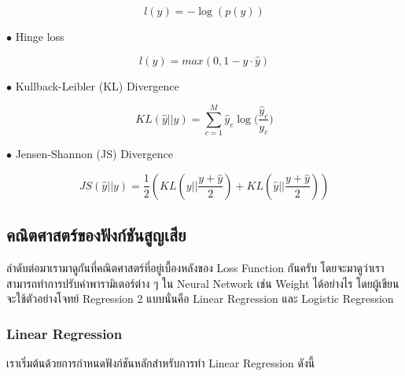 \begin{equation}
    l(y) = -{\log(p(y))}
\end{equation}

\noindent $\bullet$ Hinge loss

\begin{equation}
    l(y) = max(0, 1 - y \cdot \hat{y})
\end{equation}

\noindent $\bullet$ Kullback-Leibler (KL) Divergence

\begin{equation}
    KL(\hat{y} || y) = \sum_{c=1}^{M}\hat{y}_c \log \bigg( {\frac{\hat{y}_c}{y_c}} \bigg)
\end{equation}

\noindent $\bullet$ Jensen-Shannon (JS) Divergence

\begin{equation}
    JS(\hat{y} || y) = \frac{1}{2}(KL(y||\frac{y+\hat{y}}{2}) + KL(\hat{y}||\frac{y+\hat{y}}{2}))
\end{equation}

\subsection{คณิตศาสตร์ของฟังก์ชันสูญเสีย}

ลำดับต่อมาเรามาดูกันที่คณิตศาสตร์ที่อยู่เบื้องหลังของ Loss Function กันครับ โดยจะมาดูว่าเราสามารถทำการปรับค่าพารามิเตอร์ต่าง ๆ ใน Neural 
Network เช่น Weight ได้อย่างไร โดยผู้เขียนจะใช้ตัวอย่างโจทย์ Regression 2 แบบนั่นคือ Linear Regression และ Logistic Regression

\subsubsection{Linear Regression}

เราเริ่มต้นด้วยการกำหนดฟังก์ชันหลักสำหรับการทำ Linear Regression ดังนี้


